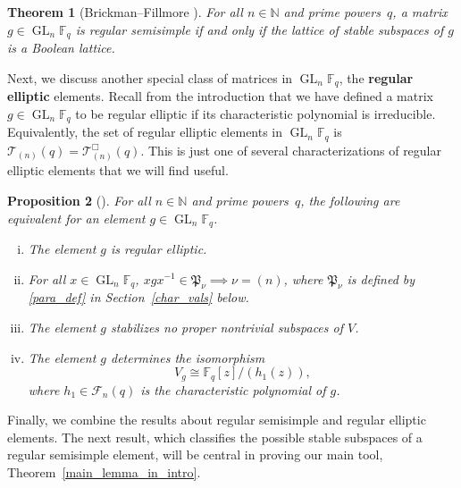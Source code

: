 \documentclass[10pt]{article}
\newtheorem{theorem}{Theorem}[section]
\newtheorem{proposition}[theorem]{Proposition}
\theoremstyle{definition}
\DeclareMathOperator{\GL}{GL}
\newcommand{\F}{\mathbb{F}}
\newcommand{\CF}{\mathcal{F}}
\newcommand{\N}{\mathbb{N}}
\newcommand{\CT}{\mathcal{T}}
\newcommand{\myemph}{\textbf}
\newcommand{\para}{\mathfrak{P}}
\begin{document}
\begin{theorem}[Brickman--Fillmore \cite{lattice}] \label{helpful}
For all \(n \in \N\) and prime powers~\(q\), a matrix \(g \in \GL_n \F_q\) is regular semisimple if and only if the lattice of stable subspaces of \(g\) is a Boolean lattice.
\end{theorem}




Next, we discuss another special class of matrices in $\GL_n \F_q$, the \myemph{regular elliptic} elements.
Recall from the introduction that we have defined a matrix \(g \in \GL_n \F_q\) to be regular elliptic if its characteristic polynomial is irreducible.
Equivalently, the set of regular elliptic elements in \(\GL_n \F_q\) is \(\CT_{(n)} (q) = \CT_{(n)}^\Box (q)\).
This is just one of several characterizations of regular elliptic elements that we will find useful.

\begin{proposition}[{\cite[Proposition~4.4]{refl_fact}}]
\label{reg_ell_char}
For all \(n \in \N\) and prime powers~\(q\), the following are equivalent for an element $g \in \GL_n \F_q$.
\begin{enumerate}[(i)]
\item The element $g$ is regular elliptic.
\item For all $x \in \GL_n \F_q$, $xgx^{-1} \in \para_\nu \implies \nu = (n)$, where \(\para_\nu\) is defined by \eqref{para_def} in Section~\ref{char_vals} below.
\item \label{no_stability} The element \(g\) stabilizes no proper nontrivial subspaces of \(V\).
\item The element \(g\) determines the isomorphism
\begin{equation}
\label{re_rcf}
V_g
\cong
\F_q[z] / (h_1(z)),
\end{equation}
where \(h_1 \in \CF_n (q)\) is the characteristic polynomial of \(g\).
\end{enumerate}
\end{proposition}


Finally, we combine the results about regular semisimple and regular elliptic elements.
The next result, which classifies the possible stable subspaces of a regular semisimple element, will be central in proving our main tool, Theorem~\ref{main_lemma_in_intro}.
\end{document}
